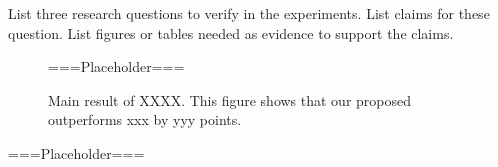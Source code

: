 List three research questions to verify in the experiments.
List claims for these question. 
List figures or tables needed as evidence to support the claims. 

\begin{figure}[htb]
    \centering
    ===Placeholder===
    \caption{Main result of XXXX. This figure shows that our proposed \method outperforms xxx by yyy points. }
    \label{fig:main_result}
\end{figure}



\begin{table}[htb]
    \centering
    ===Placeholder===
    \caption{Main result of XXX. This table shows our proposed \method outperforms xxxx by yyyy points. }
    \label{fig:main_result2}
\end{table}